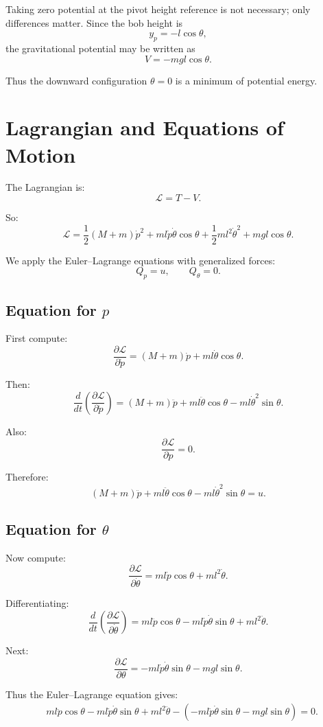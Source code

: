 \documentclass[11pt,a4paper]{article}
\begin{document}
Taking zero potential at the pivot height reference is not necessary; only differences matter. Since the bob height is
\[
y_p = -l\cos\theta,
\]
the gravitational potential may be written as
\[
V = -mgl\cos\theta.
\]

Thus the downward configuration \(\theta=0\) is a minimum of potential energy.

\section{Lagrangian and Equations of Motion}

The Lagrangian is:
\[
\mathcal{L} = T - V.
\]

So:
\[
\mathcal{L}
=
\frac{1}{2}(M+m)\dot p^2
+ ml\dot p\dot\theta\cos\theta
+ \frac{1}{2}ml^2\dot\theta^2
+ mgl\cos\theta.
\]

We apply the Euler--Lagrange equations with generalized forces:
\[
Q_p = u,
\qquad
Q_\theta = 0.
\]

\subsection{Equation for \(p\)}

First compute:
\[
\frac{\partial \mathcal{L}}{\partial \dot p}
=
(M+m)\dot p + ml\dot\theta\cos\theta.
\]

Then:
\[
\frac{d}{dt}\left(\frac{\partial \mathcal{L}}{\partial \dot p}\right)
=
(M+m)\ddot p
+ ml\ddot\theta\cos\theta
- ml\dot\theta^2\sin\theta.
\]

Also:
\[
\frac{\partial \mathcal{L}}{\partial p} = 0.
\]

Therefore:
\[
(M+m)\ddot p + ml\ddot\theta\cos\theta - ml\dot\theta^2\sin\theta = u.
\]

\subsection{Equation for \(\theta\)}

Now compute:
\[
\frac{\partial \mathcal{L}}{\partial \dot\theta}
=
ml\dot p\cos\theta + ml^2\dot\theta.
\]

Differentiating:
\[
\frac{d}{dt}\left(\frac{\partial \mathcal{L}}{\partial \dot\theta}\right)
=
ml\ddot p\cos\theta
- ml\dot p\dot\theta\sin\theta
+ ml^2\ddot\theta.
\]

Next:
\[
\frac{\partial \mathcal{L}}{\partial \theta}
=
-ml\dot p\dot\theta\sin\theta - mgl\sin\theta.
\]

Thus the Euler--Lagrange equation gives:
\begin{align*}
&ml\ddot p\cos\theta
- ml\dot p\dot\theta\sin\theta
+ ml^2\ddot\theta
- \left(-ml\dot p\dot\theta\sin\theta - mgl\sin\theta\right)
= 0.
\end{align*}
\end{document}
